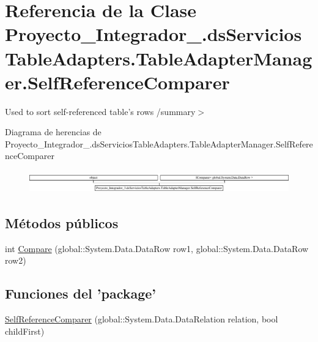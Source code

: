 \hypertarget{class_proyecto___integrador__3_1_1ds_servicios_table_adapters_1_1_table_adapter_manager_1_1_self_reference_comparer}{\section{Referencia de la Clase Proyecto\-\_\-\-Integrador\-\_.\-ds\-Servicios\-Table\-Adapters.\-Table\-Adapter\-Manager.\-Self\-Reference\-Comparer}
\label{class_proyecto___integrador__3_1_1ds_servicios_table_adapters_1_1_table_adapter_manager_1_1_self_reference_comparer}
}


Used to sort self-\/referenced table's rows /summary$>$  


Diagrama de herencias de Proyecto\-\_\-\-Integrador\-\_.\-ds\-Servicios\-Table\-Adapters.\-Table\-Adapter\-Manager.\-Self\-Reference\-Comparer\begin{figure}[H]
\begin{center}
\leavevmode
\includegraphics[height=0.975610cm]{class_proyecto___integrador__3_1_1ds_servicios_table_adapters_1_1_table_adapter_manager_1_1_self_reference_comparer}
\end{center}
\end{figure}
\subsection*{Métodos públicos}
\begin{DoxyCompactItemize}
\item 
int \hyperlink{class_proyecto___integrador__3_1_1ds_servicios_table_adapters_1_1_table_adapter_manager_1_1_self_reference_comparer_a8e226852fba6e592bf7d9a81be340051}{Compare} (global\-::\-System.\-Data.\-Data\-Row row1, global\-::\-System.\-Data.\-Data\-Row row2)
\end{DoxyCompactItemize}
\subsection*{Funciones del 'package'}
\begin{DoxyCompactItemize}
\item 
\hyperlink{class_proyecto___integrador__3_1_1ds_servicios_table_adapters_1_1_table_adapter_manager_1_1_self_reference_comparer_ab3a62ea6472e37e6d85704cdea28e806}{Self\-Reference\-Comparer} (global\-::\-System.\-Data.\-Data\-Relation relation, bool child\-First)
\end{DoxyCompactItemize}
